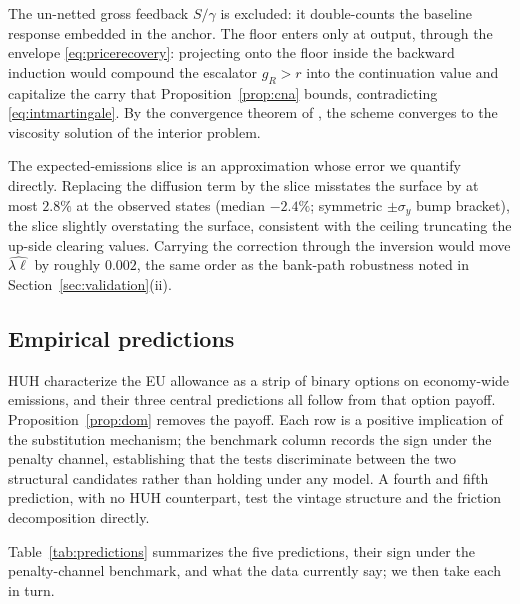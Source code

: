 \documentclass[11pt,letterpaper]{article}
\theoremstyle{plain}
\theoremstyle{definition}
\numberwithin{equation}{section}
\begin{document}
The un-netted gross feedback $S/\gamma$ is excluded: it double-counts the baseline response embedded in the anchor. The floor enters only at output, through the envelope \eqref{eq:pricerecovery}: projecting onto the floor inside the backward induction would compound the escalator $g_R>r$ into the continuation value and capitalize the carry that Proposition~\ref{prop:cna} bounds, contradicting \eqref{eq:intmartingale}. By the convergence theorem of \citet{barles1991}, the scheme converges to the viscosity solution of the interior problem.

The expected-emissions slice is an approximation whose error we quantify directly. Replacing the diffusion term by the slice misstates the surface by at most $2.8\%$ at the observed states (median $-2.4\%$; symmetric $\pm\sigma_y$ bump bracket), the slice slightly overstating the surface, consistent with the ceiling truncating the up-side clearing values. Carrying the correction through the inversion would move $\widehat{\lambda\ell}$ by roughly $0.002$, the same order as the bank-path robustness noted in Section~\ref{sec:validation}(ii).
 
\subsection{Empirical predictions}\label{sec:predictions}
 
HUH characterize the EU allowance as a strip of binary options on economy-wide emissions, and their three central predictions all follow from that option payoff. Proposition~\ref{prop:dom} removes the payoff. Each row is a positive implication of the substitution mechanism; the benchmark column records the sign under the penalty channel, establishing that the tests discriminate between the two structural candidates rather than holding under any model. A fourth and fifth prediction, with no HUH counterpart, test the vintage structure and the friction decomposition directly.

Table~\ref{tab:predictions} summarizes the five predictions, their sign under the penalty-channel benchmark, and what the data currently say; we then take each in turn.
\end{document}
